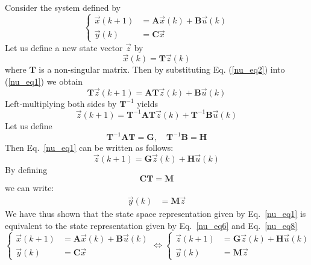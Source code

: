 \documentclass[12pt,a4paper,oneside]{book}
\begin{document}
\begin{onehalfspace}
Consider the  system defined by
\begin{equation}\label{nu_eq1}
	\left\lbrace \begin{aligned}
		\vec{x}(k+1) & = \mathbf{A}\vec{x}(k) + \mathbf{B}\vec{u}(k) \\[6pt]
		\vec{y}(k) & = \mathbf{C}\vec{x}
	\end{aligned}\right. 
\end{equation}
Let us define a new state vector ${\vec{z}}$ by
\begin{equation}\label{nu_eq2}
	{\vec{x}}(k) = \mathbf{T}{\vec{z}}(k)
\end{equation}
where $\mathbf{T}$ is a non-singular matrix. Then by substituting Eq. 
(\ref{nu_eq2}) into (\ref{nu_eq1}) we obtain
\begin{equation}\label{nu_eq3}
	\mathbf{T}{\vec{z}}(k+1) = \mathbf{A}\mathbf{T}{\vec{z}}(k)+ 
	\mathbf{B}\vec{u}(k)
\end{equation}
Left-multiplying both sides by $\mathbf{T}^{-1}$ yields
\begin{equation}\label{nu_eq4}
	{\vec{z}}(k+1) = \mathbf{T}^{-1}\mathbf{A}\mathbf{T}{\vec{z}}(k)+ 
	\mathbf{T}^{-1}\mathbf{B}\vec{u}(k)
\end{equation}
Let us define
\begin{equation*}\label{nu_eq5}
	\mathbf{T}^{-1}\mathbf{A}\mathbf{T} = {\mathbf{G}}, \quad 
	\mathbf{T}^{-1}\mathbf{B} = {\mathbf{H}}
\end{equation*}
Then Eq.~\eqref{nu_eq1} can be written as follows:
\begin{equation}\label{nu_eq6}
	{\vec{z}}(k+1) = {\mathbf{G}}{\vec{z}}(k)+ {\mathbf{H}}\vec{u}(k)
\end{equation}
By defining 
\begin{equation*}\label{nu_eq7}
	\mathbf{C}\mathbf{T} = {\mathbf{M}}
\end{equation*}
we can write:
\begin{equation}\label{nu_eq8}
	\begin{aligned}
		{\vec{y}}(k) & = \mathbf{M}{\vec{z}}
	\end{aligned}
\end{equation}
We have thus shown that the state space representation given by 
Eq.~\eqref{nu_eq1} is equivalent to the state representation given by 
Eq.~\eqref{nu_eq6} and Eq.~\eqref{nu_eq8}
\begin{equation}\label{nu_eq9}
	\left\{\begin{aligned}
		\vec{x}(k+1) & = \mathbf{A}\vec{x}(k) + \mathbf{B}\vec{u}(k) \\[6pt]
		\vec{y}(k) & = \mathbf{C}\vec{x}
	\end{aligned}\right. \iff
	\left\{\begin{aligned}
		{\vec{z}}(k+1) & = {\mathbf{G}}{\vec{z}}(k) + {\mathbf{H}}{\vec{u}}(k) 
		\\[6pt]
		\vec{y}(k) & = {\mathbf{M}}{\vec{z}}
	\end{aligned}\right.
\end{equation}


\end{onehalfspace}
\end{document}
